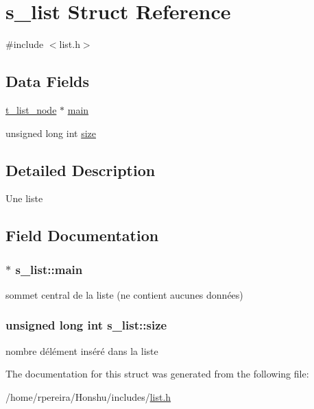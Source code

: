 \hypertarget{structs__list}{}\section{s\+\_\+list Struct Reference}
\label{structs__list}


{\ttfamily \#include $<$list.\+h$>$}

\subsection*{Data Fields}
\begin{DoxyCompactItemize}
\item 
\hyperlink{structs__list__node}{t\+\_\+list\+\_\+node} $\ast$ \hyperlink{structs__list_a0db66d7806c2c37140b726b181003618}{main}
\item 
unsigned long int \hyperlink{structs__list_a47705c299df8f5d89cd04f1dcf51eba2}{size}
\end{DoxyCompactItemize}


\subsection{Detailed Description}
Une liste 

\subsection{Field Documentation}
\subsubsection[{\texorpdfstring{main}{main}}]{$\ast$ s\+\_\+list\+::main}\hypertarget{structs__list_a0db66d7806c2c37140b726b181003618}{}\label{structs__list_a0db66d7806c2c37140b726b181003618}
sommet central de la liste (ne contient aucunes données) 
\subsubsection[{\texorpdfstring{size}{size}}]{\setlength{\rightskip}{0pt plus 5cm}unsigned long int s\+\_\+list\+::size}\hypertarget{structs__list_a47705c299df8f5d89cd04f1dcf51eba2}{}\label{structs__list_a47705c299df8f5d89cd04f1dcf51eba2}
nombre d\textquotesingle{}élément inséré dans la liste 

The documentation for this struct was generated from the following file\+:\begin{DoxyCompactItemize}
\item 
/home/rpereira/\+Honshu/includes/\hyperlink{list_8h}{list.\+h}\end{DoxyCompactItemize}
